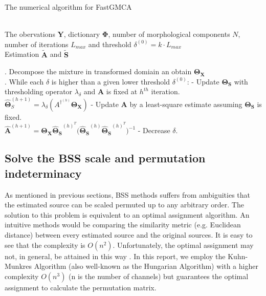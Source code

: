 \begin{algorithm}[!htbp] 
\caption{The numerical algorithm for FastGMCA}
\label{alg:Framwork} 
\begin{algorithmic}
\REQUIRE ~~\\%
The obervations $\mathbf{Y}$, dictionary $\mathbf{\Phi}$, number of morphological components $N$, number of iterations $L_{max}$ and threshold $\delta^{(0)} = k \cdot L_{max}$
\ENSURE ~~\\ %
Estimation $\tilde{\mathbf{A}}$ and $\tilde{\mathbf{S}}$

. Decompose the mixture in transformed domiain an obtain $\mathbf{\Theta_X}$\\

. While each $\delta$ is higher than a given lower threshold $\delta^{(0)}$:
\STATE \quad - Update $\mathbf{\Theta_S}$ with thresholding operator $\lambda_{\delta}$ and $\mathbf{A}$ is fixed at $h^{th}$ iteration.\\
\quad \quad $\mathbf{\hat{\Theta}}^{(h+1)}_S = \lambda_{\delta} (A^{\dagger^{(h)}}\mathbf{\Theta_X})$
\STATE \quad - Update $\mathbf{A}$ by a least-square estimate assuming $\mathbf{\Theta_S}$ is fixed.\\
\quad \quad $\mathbf{\hat{A}}^{(h+1)} = \mathbf{\Theta_X} \mathbf{\hat{\Theta}_S}^{(h)^T} 
\mathbf{(\hat{\Theta}_S}^{(h)} \mathbf{\hat{\Theta}_S}^{(h)^T})^{-1}$
\STATE \quad - Decrease $\delta$.
\end{algorithmic}
\end{algorithm}


\subsection{Solve the BSS scale and permutation indeterminacy}
As mentioned in previous sections, BSS methods suffers from ambiguities that the estimated source can be scaled permuted up to any arbitrary order. The solution to this problem is equivalent to an optimal assignment algorithm. An intuitive methods would be comparing the similarity metric (e.g. Euclidean distance) between every estimated source and the original sources. It is easy to see that the complexity is $O(n^2)$. Unfortunately, the optimal assignment may not, in general, be attained in this way \cite{1261953}. In this report, we employ the Kuhn-Munkres Algorithm (also well-known as the Hungarian Algorithm)
with a higher complexity $O(n^3)$ (n is the number of channels) but guarantees the optimal assignment to calculate the permutation matrix.

